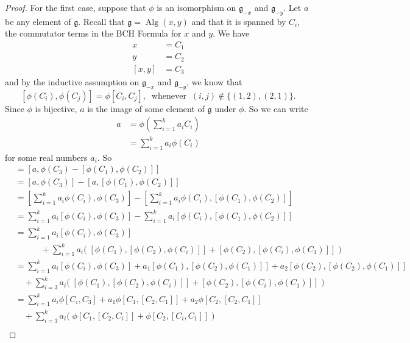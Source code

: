 \documentclass[honours]{UNSWthesis}
\newcommand{\g}{\mathfrak{g}}
\newcommand{\1}{\mathbf{e}_{1}}
\newcommand{\2}{\mathbf{e}_{3}}
\newcommand{\3}{\mathbf{e}_{3}}
\DeclareMathOperator{\alg}{Alg}
\begin{document}
\begin{proof}
For the first case, suppose that $\phi$ is an isomorphism on $\g_{-x}$ and $\g_{-y}$. \newline
Let $a$ be any element of $\g$. Recall that $\g = \alg(x,y)$ and that it is spanned by $C_{i}$, the commutator terms in the BCH Formula for $x$ and $y$. We have 
\begin{align*}
x&=C_{1}\\
y&=C_{2}\\
[x,y]&=C_{3}
\end{align*}
and by the inductive assumption on $\g_{-x}$ and $\g_{-y}$, we know that 
\[
[\phi(C_{i}),\phi(C_{j})]=\phi[C_{i},C_{j}],\;\;\text{whenever}\;\; (i,j) \notin \{(1,2),(2,1)\}.
\]
Since $\phi$ is bijective, $a$ is the image of some element of $\g$ under $\phi$. So we can write 
\begin{align*}
a &=\phi\left(\sum\limits_{i=1}^{k}a_{i}C_{i}\right)\\
&=\sum\limits_{i=1}^{k} a_{i}\phi(C_{i})
\end{align*}
for some real numbers $a_{i}$.\newline
So
\begin{align*}
[a,z] &= [a,\phi(C_{3})-[\phi(C_{1}),\phi(C_{2})]] \\
&=[a,\phi(C_{3})]-[a,[\phi(C_{1}),\phi(C_{2})]] \\
&=\left[\sum\limits_{i=1}^{k} a_{i}\phi(C_{i}),\phi(C_{3}) \right]-\left[ \sum\limits_{i=1}^{k} a_{i}\phi(C_{i}),[\phi(C_{1}),\phi(C_{2})]\right] \\
&=\sum\limits_{i=1}^{k} a_{i}[\phi(C_{i}),\phi(C_{3})]-\sum\limits_{i=1}^{k} a_{i}[\phi(C_{i}),[\phi(C_{1}),\phi(C_{2})]] \\
&=\sum\limits_{i=1}^{k} a_{i}[\phi(C_{i}),\phi(C_{3})]\\
&\quad \quad \quad+ \sum\limits_{i=1}^{k} a_{i}\big(\; [\phi(C_{1}),[\phi(C_{2}),\phi(C_{i})]]+[\phi(C_{2}),[\phi(C_{i}),\phi(C_{1})]]\;\big) \\
&=\sum\limits_{i=1}^{k} a_{i}[\phi(C_{i}),\phi(C_{3})]+a_{1}[\phi(C_{1}),[\phi(C_{2}),\phi(C_{1})]]+a_{2}[\phi(C_{2}),[\phi(C_{2}),\phi(C_{1})]] \\
&\quad+ \sum\limits_{i=3}^{k} a_{i}\big(\; [\phi(C_{1}),[\phi(C_{2}),\phi(C_{i})]]+[\phi(C_{2}),[\phi(C_{i}),\phi(C_{1})]] \;\big) \\
&=\sum\limits_{i=1}^{k} a_{i}\phi[C_{i},C_{3}]+a_{1}\phi[C_{1},[C_{2},C_{1}]]+a_{2}\phi[C_{2},[C_{2},C_{1}]] \\
&\quad+ \sum\limits_{i=3}^{k} a_{i}\big(\; \phi[C_{1},[C_{2},C_{i}]]+\phi[C_{2},[C_{i},C_{1}]] \;\big) \\

\end{align*}
\end{proof}
\end{document}
